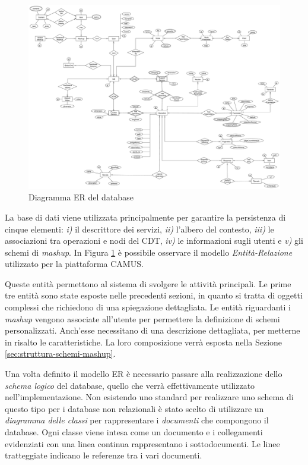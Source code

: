 \begin{figure}[p]
	\centering
	\includegraphics[height=\textwidth, angle=90]{5-implementazione-backend/Immagini/schema_er_db.pdf}
	\caption{Diagramma ER del database}\label{fig:schema-er-db}
\end{figure}

La base di dati viene utilizzata principalmente per garantire la persistenza di cinque elementi: \emph{i)} il descrittore dei servizi, \emph{ii)} l'albero del contesto, \emph{iii)} le associazioni tra operazioni e nodi del CDT, \emph{iv)} le informazioni sugli utenti e \emph{v)} gli schemi di \emph{mashup}. In Figura \ref{fig:schema-er-db} è possibile osservare il modello \emph{Entità-Relazione} utilizzato per la piattaforma CAMUS.

Queste entità permettono al sistema di svolgere le attività principali. Le prime tre entità sono state esposte nelle precedenti sezioni, in quanto si tratta di oggetti complessi che richiedono di una spiegazione dettagliata. Le entità riguardanti i \emph{mashup} vengono associate all'utente per permettere la definizione di schemi personalizzati. Anch'esse necessitano di una descrizione dettagliata, per metterne in risalto le caratteristiche. La loro composizione verrà esposta nella Sezione \ref{sec:struttura-schemi-mashup}.

Una volta definito il modello ER è necessario passare alla realizzazione dello \emph{schema logico} del database, quello che verrà effettivamente utilizzato nell'im\-ple\-men\-ta\-zio\-ne. Non esistendo uno standard per realizzare uno schema di questo tipo per i database non relazionali è stato scelto di utilizzare un \emph{diagramma delle classi} per rappresentare i \emph{documenti} che compongono il database. Ogni classe viene intesa come un documento e i collegamenti evidenziati con una linea continua rappresentano i sottodocumenti. Le linee tratteggiate indicano le referenze tra i vari documenti.

